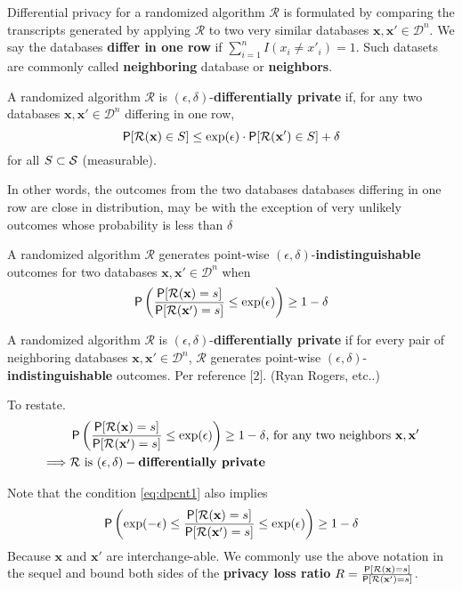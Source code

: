 \documentclass[11pt]{article}
\newcommand{\cR}{\mathcal{R}}
\newcommand{\Dsp}{\mathcal{D}}
\newcommand{\Ssp}{\mathcal{S}}
\newcommand{\xv}{\mathbf{x}}
\begin{document}

Differential privacy for a randomized algorithm $\cR$ is formulated by comparing the transcripts generated by applying $\cR$ to two very similar databases $\xv,\xv' \in \Dsp^n$.
We say the databases \textbf{differ in one row} if 
$\sum_{i=1}^n I(x_i \neq x'_i) = 1$.  
Such datasets are commonly called  \textbf{neighboring} database or  \textbf{neighbors}.
\begin{defn}
A randomized algorithm $\cR$ is $(\epsilon,\delta)$-\textbf{differentially private} if, 
for any two databases $\xv,\xv' \in \Dsp^n$ differing in one row,
\begin{equation}\label{eq:dpdef}
\P[\cR(\xv) \in S] \leq \exp(\epsilon) \cdot \P[\cR(\xv') \in S] + \delta
\end{equation}
for all $S \cont \Ssp$ (measurable).
\end{defn}
In other words, the outcomes from the two databases databases differing in one row are close in distribution, may be with the exception of very unlikely outcomes whose probability is less than $\delta$

\begin{defn}
A randomized algorithm $\cR$ generates point-wise  $(\epsilon,\delta)$-\textbf{indistinguishable} outcomes for two databases $\xv,\xv' \in \Dsp^n$ when
\begin{equation} \label{eq:dpcnt}
\P \left ( \frac{\P[\cR(\xv) = s]}{\P[\cR(\xv') = s]} \le  \exp(\epsilon) \right ) \ge 1 - \delta
\end{equation}
\end{defn}

\begin{prop} \label{prop:dpcnt}
A randomized algorithm $\cR$ is $(\epsilon,\delta)$-\textbf{differentially private} if for every pair of neighboring databases $\xv,\xv' \in \Dsp^n$, $\cR$ generates point-wise  $(\epsilon,\delta)$-\textbf{indistinguishable} outcomes.   Per reference [2].  (Ryan Rogers, etc..)

To restate.
\begin{align}
 & \P \left ( \frac{\P[\cR(\xv) = s]}{\P[\cR(\xv') = s]} \le  \exp(\epsilon) \right ) \ge 1 - \delta \text{, for any two neighbors } \xv,\xv'  \label{eq:dpcnt1} \\ 
\implies & \cR \text{ is } (\epsilon,\delta)-\textbf{differentially private}
\end{align}
\end{prop}

Note that the condition \ref{eq:dpcnt1} also implies
\[ \P \left (  \exp(-\epsilon) \le \frac{\P[\cR(\xv) = s]}{\P[\cR(\xv') = s]} \le  \exp(\epsilon) \right ) \ge 1 - \delta \]
Because $\xv$ and $\xv'$ are interchange-able.  We commonly use the above notation in the sequel and bound both sides of the \textbf{privacy loss ratio} $R =  \frac{\P[\cR(\xv) = s]}{\P[\cR(\xv') = s]}$.  
\end{document}
